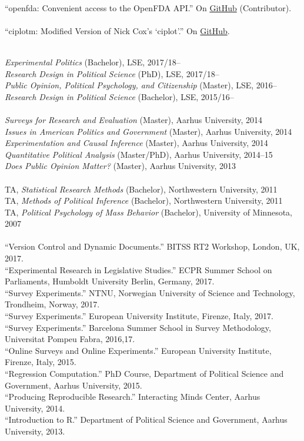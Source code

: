 \documentclass[12pt]{article}
\renewcommand{\section}[1]{\pagebreak[3]%
    \llap{\scshape\smash{\parbox[t]{\marginparwidth}{\raggedright {\color{lg}#1}}}}%
    \vspace{-\baselineskip}\par}
\newcommand{\topic}[1]{\pagebreak[3]\indent {\color{lg}{\footnotesize #1 }}\\}
\newcommand{\entry}[1]{\indent {\color{lg}\guillemotright}\hspace{2pt}#1\vspace{.25em}\\}
\begin{document}
    \topic{R packages contributed to the rOpenHealth project}
	\entry{``openfda: Convenient access to the OpenFDA API.'' On \href{https://github.com/ropenhealth/openfda}{GitHub} (Contributor).}

	\topic{Stata Packages}
	\entry{``ciplotm: Modified Version of Nick Cox's `ciplot'.'' On \href{https://github.com/leeper/ciplotm}{GitHub}.}

\section{Teaching \&\\ Advising}
\topic{Lecturing: London School of Economics and Political Science}
	\entry{\textit{Experimental Politics} (Bachelor), LSE, 2017/18--}
	\entry{\textit{Research Design in Political Science} (PhD), LSE, 2017/18--}
	\entry{\textit{Public Opinion, Political Psychology, and Citizenship} (Master), LSE, 2016--}
	\entry{\textit{Research Design in Political Science} (Bachelor), LSE, 2015/16--}

\topic{Lecturing: Aarhus University}
	\entry{\textit{Surveys for Research and Evaluation} (Master), Aarhus University, 2014}
	\entry{\textit{Issues in American Politics and Government} (Master), Aarhus University, 2014}
	\entry{\textit{Experimentation and Causal Inference} (Master), Aarhus University, 2014}
	\entry{\textit{Quantitative Political Analysis} (Master/PhD), Aarhus University, 2014--15}
	\entry{\textit{Does Public Opinion Matter?} (Master), Aarhus University, 2013}

\topic{Class Teaching: Northwestern University}
	\entry{TA, \textit{Statistical Research Methods} (Bachelor), Northwestern University, 2011} %
	\entry{TA, \textit{Methods of Political Inference} (Bachelor), Northwestern University, 2011} %
	\entry{TA, \textit{Political Psychology of Mass Behavior} (Bachelor), University of Minnesota, 2007} %

\topic{Short courses}
	\entry{``Version Control and Dynamic Documents.'' BITSS RT2 Workshop, London, UK, 2017.}
    \entry{``Experimental Research in Legislative Studies.'' ECPR Summer School on Parliaments, Humboldt University Berlin, Germany, 2017.}
    \entry{``Survey Experiments.'' NTNU, Norwegian University of Science and Technology, Trondheim, Norway, 2017.}
	\entry{``Survey Experiments.'' European University Institute, Firenze, Italy, 2017.}
	\entry{``Survey Experiments.'' Barcelona Summer School in Survey Methodology, Universitat Pompeu Fabra, 2016,17.}
	\entry{``Online Surveys and Online Experiments.'' European University Institute, Firenze, Italy, 2015.}
	\entry{``Regression Computation.'' PhD Course, Department of Political Science and Government, Aarhus University, 2015.}
	\entry{``Producing Reproducible Research.'' Interacting Minds Center, Aarhus University, 2014.}
	\entry{``Introduction to R.'' Department of Political Science and Government, Aarhus University, 2013.}
\end{document}
